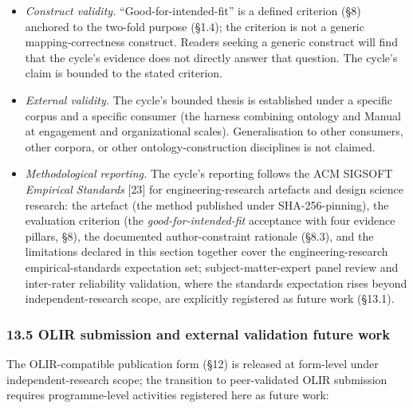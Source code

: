 \documentclass[
]{article}
\providecommand{\tightlist}{%
  \setlength{\itemsep}{0pt}\setlength{\parskip}{0pt}}
\begin{document}
\begin{itemize}
\tightlist
\item
  \emph{Construct validity.} ``Good-for-intended-fit'' is a defined
  criterion (§8) anchored to the two-fold purpose (§1.4); the criterion
  is not a generic mapping-correctness construct. Readers seeking a
  generic construct will find that the cycle's evidence does not
  directly answer that question. The cycle's claim is bounded to the
  stated criterion.
\item
  \emph{External validity.} The cycle's bounded thesis is established
  under a specific corpus and a specific consumer (the harness combining
  ontology and Manual at engagement and organizational scales).
  Generalisation to other consumers, other corpora, or other
  ontology-construction disciplines is not claimed.
\item
  \emph{Methodological reporting.} The cycle's reporting follows the ACM
  SIGSOFT \emph{Empirical Standards} {[}23{]} for engineering-research
  artefacts and design science research: the artefact (the method
  published under SHA-256-pinning), the evaluation criterion (the
  \emph{good-for-intended-fit} acceptance with four evidence pillars,
  §8), the documented author-constraint rationale (§8.3), and the
  limitations declared in this section together cover the
  engineering-research empirical-standards expectation set;
  subject-matter-expert panel review and inter-rater reliability
  validation, where the standards expectation rises beyond
  independent-research scope, are explicitly registered as future work
  (§13.1).
\end{itemize}

\subsubsection{13.5 OLIR submission and external validation future
work}\label{olir-submission-and-external-validation-future-work}

The OLIR-compatible publication form (§12) is released at form-level
under independent-research scope; the transition to peer-validated OLIR
submission requires programme-level activities registered here as future
work:
\end{document}
